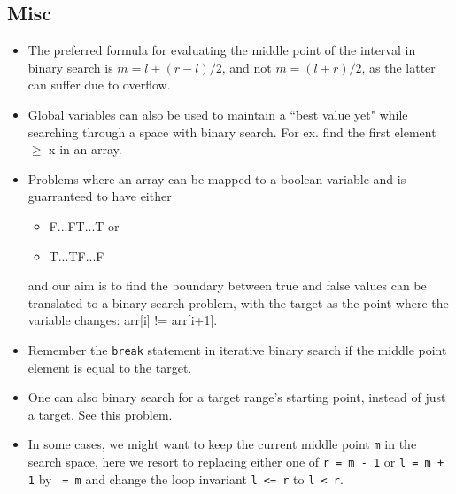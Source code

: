 \documentclass{report}
\newcommand*{\algodis}[4]{
    \textbf{#1:} #2\\%
    \textbf{Time:} #3 \\%
    \textbf{Space:} #4
}
\begin{document}
\subsection*{Misc}
\begin{itemize}
    \item The preferred formula for evaluating the middle point of
    the interval in binary search is
    $m = l + (r-l)/2$, and not
    $m = (l+r)/2$, as the latter can suffer due to overflow.
    \item Global variables can also be used to maintain a ``best value yet" while searching through a space with binary search. For ex. find the first element $\geq$ x in an array.
    \item Problems where an array can be mapped to a boolean variable and is guarranteed to have either
    \begin{itemize}
        \item F...FT...T or
        \item T...TF...F
    \end{itemize}
    and our aim is to find the boundary between true and false
    values can be translated to a binary search problem, with 
    the target as the point where the variable changes:
    arr[i] != arr[i+1].
    \item Remember the \texttt{break} statement in iterative binary search if the middle point element is equal to the target.
    \item One can also binary search for a target range's starting point, instead of just a target. \href{https://leetcode.com/problems/find-k-closest-elements/}{See this problem.}
    \item In some cases, we might want to keep the current middle point \texttt{m} in the search space,
    here we resort to replacing either one of \texttt{r = m - 1} or \texttt{l = m + 1} by \texttt{ = m}
    and change the loop invariant \texttt{l <= r} to \texttt{l < r}. 
\end{itemize}
\end{document}
